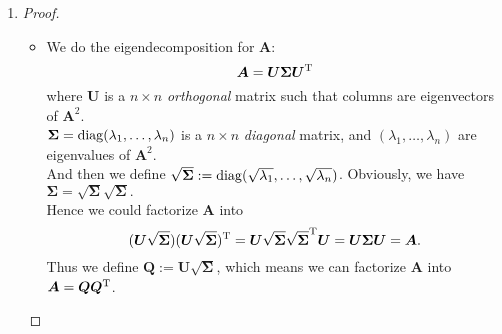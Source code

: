 \begin{enumerate}
\begin{proof}
\begin{itemize}
\begin{align*}
\bm A\trans\bm A\bm y&=\bm A\trans\bm A(\alpha_1\bm p_1+\alpha_2\bm p_2+\dots+\alpha_n\bm p_n)\\
&=\alpha_1(\bm A\trans\bm A\bm p_1)+\alpha_2(\bm A\trans\bm A\bm p_2)+\dots+\alpha_n(\bm A\trans\bm A\bm p_n)\\
&=\alpha_1\lambda_1\bm p_1+\alpha_2\lambda_2\bm p_2+\dots+\alpha_n\lambda_n\bm p_n
\end{align*}
Hence the product $\bm y\trans(\bm A\trans\bm A\bm y)$ is given by:
\begin{align*}
\bm y\trans(\bm A\trans\bm A\bm y)&=
\bm y\trans(\alpha_1\lambda_1\bm p_1+\alpha_2\lambda_2\bm p_2+\dots+\alpha_n\lambda_n\bm p_n)\\
&=\left(
\sum_{i=1}^{n}\alpha_i\bm p_i\trans
\right)
\left(
\sum_{j=1}^{n}\alpha_j\lambda_j\bm p_j
\right)
=\sum_{i=1}^{n}\sum_{j=1}^{n}\alpha_i\alpha_j\lambda_j\bm p_i\trans\bm p_j\\
&=\sum_{i=1}^{n}\alpha_i^2\lambda_i\\
&\le\lambda_1\sum_{i=1}^{n}\alpha_i^2=\lambda_1.
\end{align*}
The equality is satisfied when $\bm y=\bm p_1.$ Hence $\max_{\bm y}\bm y\trans(\bm A\trans\bm A\bm y)=\lambda_1$.\\
Since $\lambda_1=\sigma_1^2$, we derive $\max_{\bm y}\bm y\trans(\bm A\trans\bm A\bm y)=\sigma^2_1$.
\end{itemize}
\end{proof}
\item
\begin{proof}
\begin{itemize}
\item
We do the eigendecomposition for $\bm A$:
\[
\bm A=\bm U\bm\Sigma\bm U^{\mathrm T}
\]
where $\bm U$ is a $n\times n$ \emph{orthogonal} matrix such that columns are eigenvectors of $\bm A^2$.\\
$\bm\Sigma=\operatorname{diag}(\lambda_1,\dots,\lambda_n)$ is a $n\times n$ \textit{diagonal} matrix, and $(\lambda_1,\dots,\lambda_n)$ are eigenvalues of $\bm A^2$.\\
And then we define $\sqrt{\bm\Sigma}:=\operatorname{diag}(\sqrt{\lambda_1},\dots,\sqrt{\lambda_n})$. Obviously, we have $\bm\Sigma=\sqrt{\bm\Sigma}\sqrt{\bm\Sigma}.$\\
Hence we could factorize $\bm A$ into
\[
(\bm U\sqrt{\bm\Sigma})(\bm U\sqrt{\bm\Sigma})^{\mathrm T}
=\bm U\sqrt{\bm\Sigma}\sqrt{\bm\Sigma}^{\mathrm T}\bm U
=\bm U\bm\Sigma\bm U=\bm A.
\]
Thus we define $\bm Q:=\bm U\sqrt{\bm\Sigma}$, which means we can factorize $\bm A$ into $\bm A=\bm Q\bm Q^{\mathrm T}$.

\end{itemize}
\end{proof}
\end{enumerate}
